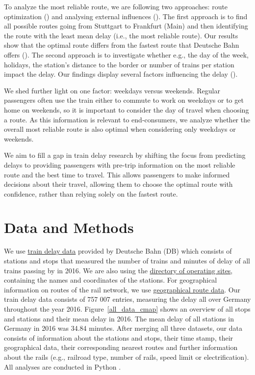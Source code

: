 \documentclass{article}
\theoremstyle{plain}
\theoremstyle{definition}
\theoremstyle{remark}
\begin{document}
To analyze the most reliable route, we are following two approaches: route optimization () and analysing external influences (). The first approach is to find all possible routes going from Stuttgart to Frankfurt (Main) and then identifying the route with the least mean delay (i.e., the most reliable route). Our results show that the optimal route differs from the fastest route that Deutsche Bahn offers (). The second approach is to investigate whether e.g., the day of the week, holidays, the station's distance to the border or number of trains per station impact the delay. Our findings display several factors influencing the delay ().

We shed further light on one factor: weekdays versus weekends. Regular passengers often use the train either to commute to work on weekdays or to get home on weekends, so it is important to consider the day of travel when choosing a route. As this information is relevant to end-consumers, we analyze whether the overall most reliable route is also optimal when considering only weekdays or weekends.

We aim to fill a gap in train delay research by shifting the focus from predicting delays to providing passengers with pre-trip information on the most reliable route and the best time to travel. This allows passengers to make informed decisions about their travel, allowing them to choose the optimal route with confidence, rather than relying solely on the fastest route.


\section{Data and Methods}\label{sec:methods}

We use \href{https://data.deutschebahn.com/dataset/ist-verkehrsdaten-der-db-cargo-auf-bst8-ebene.html}{train delay data} provided by Deutsche Bahn (DB) which consists of stations and stops that measured the number of trains and minutes of delay of all trains passing by in 2016. We are also using the \href{https://data.deutschebahn.com/dataset/betriebsstellen-gueterverkehr.html}{directory of operating sites}, containing the names and coordinates of the stations. For geographical information on routes of the rail network, we use \href{https://data.deutschebahn.com/dataset/betriebsstellen-gueterverkehr.html}{geographical route data}. Our train delay data consists of 757 007 entries, measuring the delay all over Germany throughout the year 2016. Figure~\ref{all_data_cmap} shows an overview of all stops and stations and their mean delay in 2016. The mean delay of all stations in Germany in 2016 was 34.84 minutes. After merging all three datasets, our data consists of information about the stations and stops, their time stamp, their geographical data, their corresponding nearest routes and further information about the rails (e.g., railroad type, number of rails, speed limit or electrification). All analyses are conducted in Python \cite{1995python}.
\end{document}
